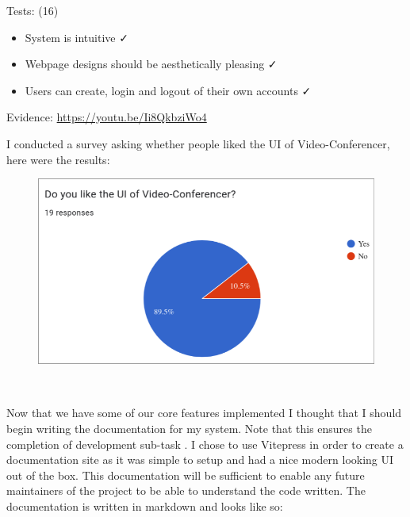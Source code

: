 {\sffamily Tests: (16)}

\begin{itemize}
  \item System is intuitive \faCheck \\
  \item Webpage designs should be aesthetically pleasing \faCheck \\
  \item Users can create, login and logout of their own accounts \faCheck \\
\end{itemize}

{\sffamily Evidence:} \url{https://youtu.be/Ii8QkbziWo4} \\ \vspace{0.2cm}

I conducted a survey asking whether people liked the UI of Video-Conferencer, here were the results:

\begin{figure}[H]
\centering
\includegraphics[scale=0.2]{Images/Survey.png}
\end{figure}

{\color{gray} \hrulefill} \\ \vspace{0.2cm}

Now that we have some of our core features implemented I thought that I should begin writing the documentation for
my system. Note that this ensures the completion of development sub-task . I chose to use Vitepress in
order to create a documentation site as it was simple to setup and had a nice modern looking UI out of the box. This
documentation will be sufficient to enable any future maintainers of the project to be able to understand the
code written. The documentation is written in markdown and looks like so:

